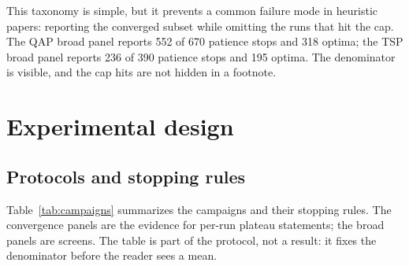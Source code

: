 \documentclass[11pt]{article}
\begin{document}
This taxonomy is simple, but it prevents a common failure mode in heuristic papers: reporting the
converged subset while omitting the runs that hit the cap. The QAP broad panel reports 552 of 670
patience stops and 318 optima; the TSP broad panel reports 236 of 390 patience stops and 195 optima.
The denominator is visible, and the cap hits are not hidden in a footnote.

\section{Experimental design}
\label{sec:design}

\subsection{Protocols and stopping rules}

Table~\ref{tab:campaigns} summarizes the campaigns and their stopping rules. The convergence panels
are the evidence for per-run plateau statements; the broad panels are screens. The table is part of
the protocol, not a result: it fixes the denominator before the reader sees a mean.

\begin{table}[t]
\centering
\caption{Campaigns and stopping rules. The broad panels are fixed-budget screens and are not pooled
with the convergence panels.}
\label{tab:campaigns}
\small
{}
\end{table}
\end{document}

